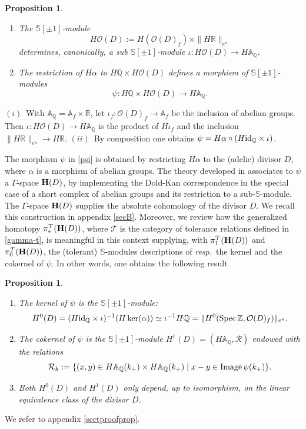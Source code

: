 \documentclass[cupthm]{CUP-JNL-JMJ}
\numberwithin{equation}{section}
\theoremstyle{cupplain}
\newtheorem{proposition}[theorem]{Proposition}
\theoremstyle{cupdefinition}
\theoremstyle{cupremark}
\theoremstyle{cupproof}
\def\A{{\mathbb A}}
\def\Q{{\mathbb Q}}
\def\R{{\mathbb R}}
\def\S{{\mathbb S}}
\def\Z{{\mathbb Z}}
\def\cO{{\mathcal O}}
\def\cR{{\mathcal R}}
\def\cT{{\mathcal T}}
\def\bfh{{\bf H}}
\def\Spec{{\rm Spec\,}}
\def\sss{{\S}}
\def\spm{{\sss[\pm 1]}}
\def\id{{\rm id}}
\def\pik{\pi^{\cT}}
\def\spz{{\Spec\Z}}
\newcommand{\resp}{{\it resp.\/}\ }
\begin{document}
\begin{proposition} \label{setup}
\begin{enumerate}
\item[(i)] The $\spm$-module 
\[
H\cO(D):=H(\cO(D)_f)\times \| H\R\|_{e^a}
\]
determines, canonically, a sub $\spm$-module $\iota:H\cO(D)\longrightarrow H\A_\Q$.
\item[(ii)] The restriction  of $H\alpha$ to $H\Q\times H\cO(D)$ defines a morphism of $\spm$-modules \begin{equation}\label{psi}
 \psi: H\Q\times H\cO(D) \longrightarrow H\A_\Q.
 \end{equation} 	
\end{enumerate}
\end{proposition}
\proof $(i)$~With $\A_\Q=\A_f\times \R$, let $\iota_f:\cO(D)_f\to \A_f$ be the inclusion of abelian groups.  Then  $\iota:H\cO(D)\to H\A_\Q$ is the product of $H\iota_f$ and the inclusion $\| H\R\|_{e^a}\to H\R$.\newline
 $(ii)$~By composition one obtains $\psi= H\alpha \circ (H\id_\Q \times \iota)$. \endproof 
 
 The morphism $\psi$ in \eqref{psi} is obtained by restricting  $H\alpha$  to the (adelic) divisor $D$, where $\alpha$ is a morphism of abelian groups.   The theory developed in \cite{CCAtiyah}  associates to   $\psi$ a $\Gamma$-space $\bfh(D)$, by implementing the Dold-Kan correspondence in the special case of a short complex of abelian groups and its restriction to a sub-$\sss$-module. The $\Gamma$-space $\bfh(D)$  supplies the absolute cohomology of the divisor $D$. We recall this construction in appendix \ref{secB}. Moreover, we review how the generalized homotopy $\pik_\ast(\bfh(D))$, where $\cT$ is the category of tolerance relations defined in \ref{gamma-t},  is meaningful in this context supplying, with $\pik_1(\bfh(D))$   and $\pik_0(\bfh(D))$,  the (tolerant) $\sss$-modules descriptions  of \resp  the  kernel and the cokernel  of $\psi$. In other words, one obtains the following result

\begin{proposition} \label{setup1}
\begin{enumerate}
\item[(i)] The kernel  of $\psi$ is the  $\spm$-module:
\begin{equation}\label{kerpsi}
H^0(D) =(H\id_\Q \times \iota)^{-1}( H\ker( \alpha))\simeq \iota^{-1} H\Q =\Vert H^0(\spz ,\cO(D)_f)\Vert_{e^a}. 
\end{equation}
\item[(ii)] The cokernel of $\psi$ is the  $\spm$-module $H^1(D) = (H\A_\Q, \cR)$  endowed with the relations
\begin{equation}\label{cokerpsi}
 \cR_k:=\{ (x,y)\in H\A_\Q(k_+)\times  H\A_\Q(k_+)\mid x-y\in {\rm Image}\, \psi(k_+)\}.
\end{equation}
\item[(iii)] Both $H^0(D)$ and $H^1(D)$ only depend, up to isomorphism, on the linear equivalence class of the divisor $D$.
\end{enumerate}
\end{proposition}
\proof We refer to appendix \ref{sectproofprop}.
\endproof  
\end{document}
